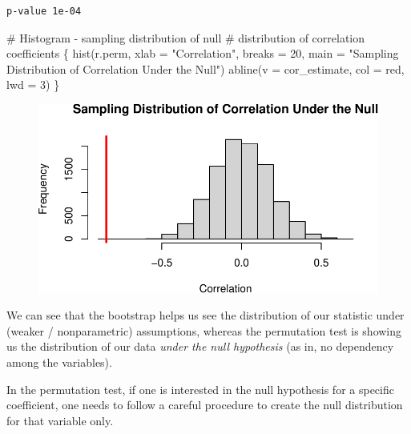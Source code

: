 \documentclass[
  letterpaper,
  DIV=11,
  numbers=noendperiod]{scrreport}
\newenvironment{Shaded}{\begin{snugshade}}{\end{snugshade}}
\newcommand{\AttributeTok}[1]{\textcolor[rgb]{0.40,0.45,0.13}{#1}}
\newcommand{\CommentTok}[1]{\textcolor[rgb]{0.37,0.37,0.37}{#1}}
\newcommand{\DecValTok}[1]{\textcolor[rgb]{0.68,0.00,0.00}{#1}}
\newcommand{\FunctionTok}[1]{\textcolor[rgb]{0.28,0.35,0.67}{#1}}
\newcommand{\NormalTok}[1]{\textcolor[rgb]{0.00,0.23,0.31}{#1}}
\newcommand{\StringTok}[1]{\textcolor[rgb]{0.13,0.47,0.30}{#1}}
\begin{document}
\begin{verbatim}
p-value 1e-04
\end{verbatim}

\begin{Shaded}
\begin{Highlighting}[]
\CommentTok{\# Histogram {-} sampling distribution of null }
\CommentTok{\# distribution of correlation coefficients}
\NormalTok{\{}
\FunctionTok{hist}\NormalTok{(r.perm, }\AttributeTok{xlab =} \StringTok{"Correlation"}\NormalTok{, }\AttributeTok{breaks =} \DecValTok{20}\NormalTok{, }\AttributeTok{main =} \StringTok{"Sampling Distribution of Correlation Under the Null"}\NormalTok{)}
\FunctionTok{abline}\NormalTok{(}\AttributeTok{v =}\NormalTok{ cor\_estimate, }\AttributeTok{col =} \StringTok{\textquotesingle{}red\textquotesingle{}}\NormalTok{, }\AttributeTok{lwd =} \DecValTok{3}\NormalTok{)}
\NormalTok{\}}
\end{Highlighting}
\end{Shaded}

\begin{figure}[H]

{\centering \includegraphics{week6/week6_files/figure-pdf/unnamed-chunk-8-1.pdf}

}

\end{figure}

We can see that the bootstrap helps us see the distribution of our
statistic under (weaker / nonparametric) assumptions, whereas the
permutation test is showing us the distribution of our data \emph{under
the null hypothesis} (as in, no dependency among the variables).

In the permutation test, if one is interested in the null hypothesis for
a specific coefficient, one needs to follow a careful procedure to
create the null distribution for that variable only.
\end{document}
